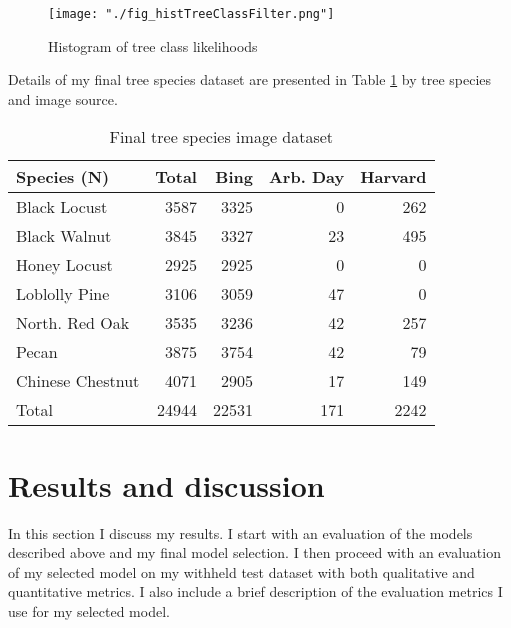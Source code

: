 \documentclass[10pt,twocolumn,letterpaper]{article}
\begin{document}
\begin{figure}[!htbp]
  \centering
  \texttt{[image: "./fig\_histTreeClassFilter.png"]}
  \caption{\label{fig:hist_tree_class} Histogram of tree class likelihoods}
\end{figure}


Details of my final tree species dataset are presented in Table \ref{tab:dataset_final} by tree species and image source.

\begin{table}[!htbp]
  \begin{center}
    \small
  \begin{tabular}{|l|r|r|r|r|}
  \hline
  Species (N) & Total & Bing & Arb. Day & Harvard \\
  \hline\hline
  Black Locust & 3587 & 3325 & 0 & 262\\
   Black Walnut & 3845 & 3327 & 23 & 495\\
   Honey Locust & 2925 & 2925 & 0 & 0\\
   Loblolly Pine & 3106 & 3059 & 47 & 0\\
   North. Red Oak & 3535 & 3236 & 42 & 257\\
   Pecan & 3875 & 3754 & 42 & 79\\
   Chinese Chestnut & 4071 & 2905 & 17 & 149\\
   \hline\hline
   Total & 24944 & 22531 & 171 & 2242\\
  \hline
  \end{tabular}
  \end{center}
  \caption{\label{tab:dataset_final} Final tree species image dataset}
  \end{table}

\section{Results and discussion}
\label{sec:results}
In this section I discuss my results. I start with an evaluation of the models described above and my final model selection. I then proceed with an evaluation of my selected model on my withheld test dataset with both qualitative and quantitative metrics. I also include a brief description of the evaluation metrics I use for my selected model. 
\end{document}
